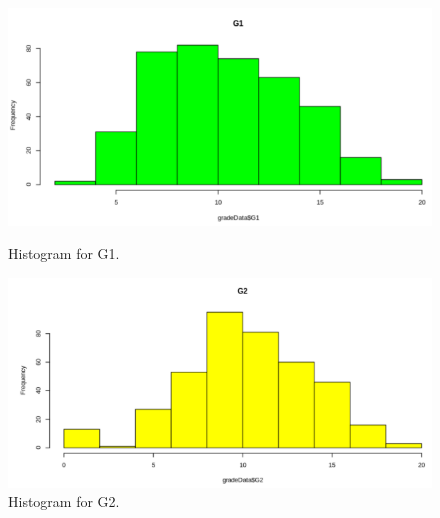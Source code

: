 \documentclass[a4paper]{article}
\begin{document}
\begin{figure}[H]
    \centering
    \begin{minipage}{0.5\textwidth}
        \centering
        \includegraphics[width = 1\linewidth]{Images/9.PNG}
        \caption{Histogram for G1.}
        \label{fig:hist2}
    \end{minipage}%
    \begin{minipage}{0.5\textwidth}
        \centering
        \includegraphics[width = 1\linewidth]{Images/10.PNG}
        \caption{Histogram for G2.}
        \label{fig:hist3}
    \end{minipage}
\end{figure}
\end{document}
